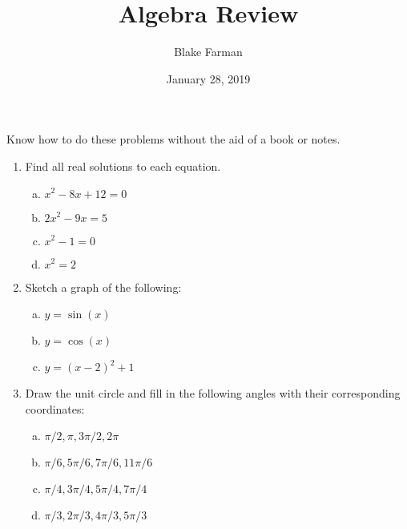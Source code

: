 \documentclass{amsart}
\title{Algebra Review}
\date{January 28, 2019}
\author{Blake Farman}
\begin{document}
\maketitle

\makenameslot

\begin{center}
  {\large Know how to do these problems without the aid of a book or notes.}
\end{center}
\begin{enumerate}[1.]
  
\item Find all real solutions to each equation.

  \begin{enumerate}[(a)]
  \item
    \(x^2- 8x + 12 = 0\)
    \vspace{1in}
  \item
    \(2x^2-9x = 5\)
    \vspace{1in}
  \item
    \(x^2-1 = 0\)
    \vspace{1in}
  \item
    \(x^2 = 2\)
    \vspace{1in}
  \end{enumerate}

  \newpage
  
\item Sketch a graph of the following:

  \begin{enumerate}[(a)]
  \item
    \(y=\sin(x)\)
    \vspace{3in}
  \item
    \(y = \cos(x)\)
    \vspace{3in}
  \item
    \(y=(x-2)^2+1\)
  \end{enumerate}
  
  \newpage
  
\item Draw the unit circle and fill in the following angles with their corresponding coordinates:

  \begin{enumerate}[(a)]
  \item
    \(\pi/2,\pi,3\pi/2,2\pi\)
    \vspace{2in}
  \item
    \(\pi/6,5\pi/6,7\pi/6,11\pi/6\)
    \vspace{2in}
  \item
    \(\pi/4,3\pi/4,5\pi/4,7\pi/4\)
    \vspace{2in}
  \item
    \(\pi/3,2\pi/3,4\pi/3,5\pi/3\)
  \end{enumerate}
  \newpage


\end{enumerate}
\end{document}
